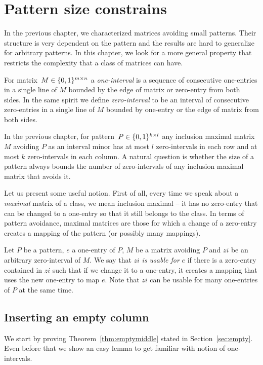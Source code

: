\chapter{Pattern size constrains}
\label{intervals}
In the previous chapter, we characterized matrices avoiding small patterns. Their structure is very dependent on the pattern and the results are hard to generalize for arbitrary patterns. In this chapter, we look for a more general property that restricts the complexity that a class of matrices can have.

\begin{defn}
For matrix~$M\in\{0,1\}^{m\times n}$ a \emph{one-interval} is a sequence of consecutive one-entries in a single line of $M$ bounded by the edge of matrix or zero-entry from both sides. In the same spirit we define \emph{zero-interval} to be an interval of consecutive zero-entries in a single line of $M$ bounded by one-entry or the edge of matrix from both sides.
\end{defn}

In the previous chapter, for pattern~$P\in\{0,1\}^{k\times l}$ any inclusion maximal matrix $M$ avoiding $P$ as an interval minor has at most $l$ zero-intervals in each row and at most $k$ zero-intervals in each column. A natural question is whether the size of a pattern always bounds the number of zero-intervals of any inclusion maximal matrix that avoids it.

Let us present some useful notion. First of all, every time we speak about a \emph{maximal} matrix of a class, we mean inclusion maximal -- it has no zero-entry that can be changed to a one-entry so that it still belongs to the class. In terms of pattern avoidance, maximal matrices are those for which a change of a zero-entry creates a mapping of the pattern (or possibly many mappings).

\begin{defn}
Let $P$ be a pattern, $e$ a one-entry of $P$, $M$ be a matrix avoiding $P$ and $zi$ be an arbitrary zero-interval of $M$. We say that $zi$ \emph{is usable for} $e$ if there is a zero-entry contained in $zi$ such that if we change it to a one-entry, it creates a mapping that uses the new one-entry to map $e$. Note that $zi$ can be usable for many one-entries of $P$ at the same time. 
\end{defn}

\section{Inserting an empty column}
We start by proving Theorem~\ref{thm:emptymiddle} stated in Section~\ref{sec:empty}. Even before that we show an easy lemma to get familiar with notion of one-intervals.

